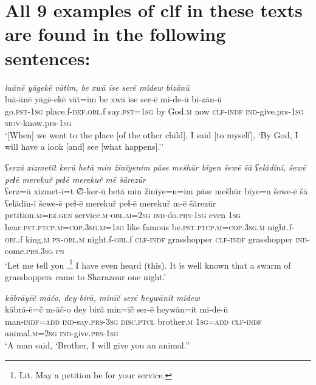 \chapter{All 9 examples of clf in these texts are found in the following sentences:}

\ea \label{ZQ.35}
\textit{luānē yāgekē vātim, be xwā īse serē midew bizānū} \\ 
\gll luā-ānē yāgē-ekē vāt=im be xwā īse ser-ē mi-de-ū bi-zān-ū \\ 
 go\textsc{.pst}\textsc{-\textsc{1sg}} place.f\textsc{-def}\textsc{.obl}.f say\textsc{.pst}\textsc{=\textsc{1sg}} by God\textsc{.m} now \textsc{clf}\textsc{-indf} \textsc{ind-}give.prs\textsc{-\textsc{1sg}} \textsc{sbjv-}know.prs\textsc{-\textsc{1sg}} \\ 
\glt `[When] we went to the place [of the other child], I said [to myself], ‘By God, I will have a look [and] see [what happens].’'
\z 
 
\ea \label{PM.1}
\textit{ʕerzū xizmetīt kerū hetā min žinīyenim pāse mešhūr bīyen šewē šā ʕelādīnī, šewē peɫē merekuř peɫē merekuř mē šārezūr} \\ 
\gll ʕerz=ū xizmet-ī=t ∅-ker-ū hetā min žinīye=n=im pāse mešhūr bīye=n šewe-ē šā ʕelādīn-ī šewe-ē peɫ-ē merekuř peɫ-ē merekuř m-ē šārezūr \\ 
 petition\textsc{.m}\textsc{\textsc{=ez.gen}} service\textsc{.m}\textsc{-obl}\textsc{.m}\textsc{=\textsc{2sg}} \textsc{ind-}do\textsc{.prs}\textsc{-\textsc{1sg}} even \textsc{1sg} hear\textsc{.pst}\textsc{.ptcp}\textsc{.m}\textsc{=cop}\textsc{.3sg}\textsc{.m}\textsc{=\textsc{1sg}} like famous be\textsc{.pst}\textsc{.ptcp}\textsc{.m}\textsc{=cop}\textsc{.3sg}\textsc{.m} night.f\textsc{-obl}.f king\textsc{.m} \textsc{pn}\textsc{-obl}\textsc{.m} night.f\textsc{-obl}.f \textsc{clf}\textsc{-indf} grasshopper \textsc{clf}\textsc{-indf} grasshopper \textsc{ind-}come\textsc{.prs}\textsc{.3sg} \textsc{pn} \\ 
\glt `Let me tell you .\footnote{Lit. May a petition be for your service.} I have even heard (this). It is well known that a swarm of grasshoppers came to Sharazour one night.'
\z 
 
\ea \label{ZP.121}
\textit{kābrāyēč māčo, dey birā, minīč serē heywānit midew} \\ 
\gll kābrā-ē=č m-āč-o dey birā min=īč ser-ē heywān=it mi-de-ū \\ 
 man\textsc{-indf}\textsc{=add} \textsc{ind-}say\textsc{.prs}\textsc{-3sg} \textsc{disc.ptcl} brother\textsc{.m} \textsc{1sg}\textsc{=add} \textsc{clf}\textsc{-indf} animal\textsc{.m}\textsc{=\textsc{2sg}} \textsc{ind-}give\textsc{.prs}\textsc{-\textsc{1sg}} \\ 
\glt `A man said, ‘Brother, I will give you an animal.’'
\z 
 
